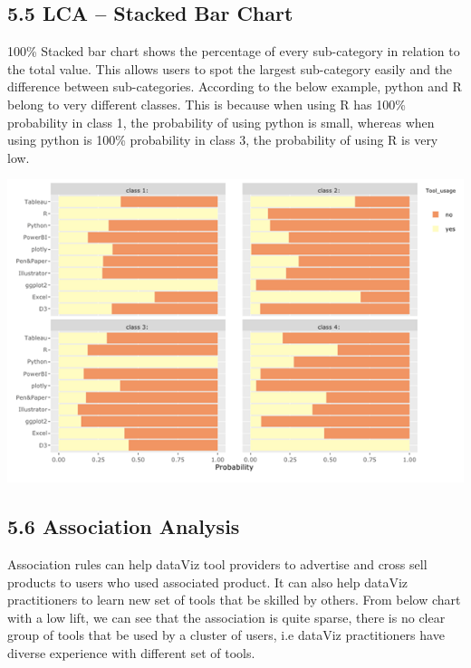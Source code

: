 \documentclass{acm_proc_article-sp}
\begin{document}
\hypertarget{lca-stacked-bar-chart}{%
\subsection{5.5 LCA -- Stacked Bar Chart}\label{lca-stacked-bar-chart}}

100\% Stacked bar chart shows the percentage of every sub-category in
relation to the total value. This allows users to spot the largest
sub-category easily and the difference between sub-categories. According
to the below example, python and R belong to very different classes.
This is because when using R has 100\% probability in class 1, the
probability of using python is small, whereas when using python is 100\%
probability in class 3, the probability of using R is very low.

\begin{center}\includegraphics[width=1\linewidth]{13} \end{center}

\hypertarget{association-analysis-3}{%
\subsection{5.6 Association Analysis}\label{association-analysis-3}}

Association rules can help dataViz tool providers to advertise and cross
sell products to users who used associated product. It can also help
dataViz practitioners to learn new set of tools that be skilled by
others. From below chart with a low lift, we can see that the
association is quite sparse, there is no clear group of tools that be
used by a cluster of users, i.e dataViz practitioners have diverse
experience with different set of tools.
\end{document}
